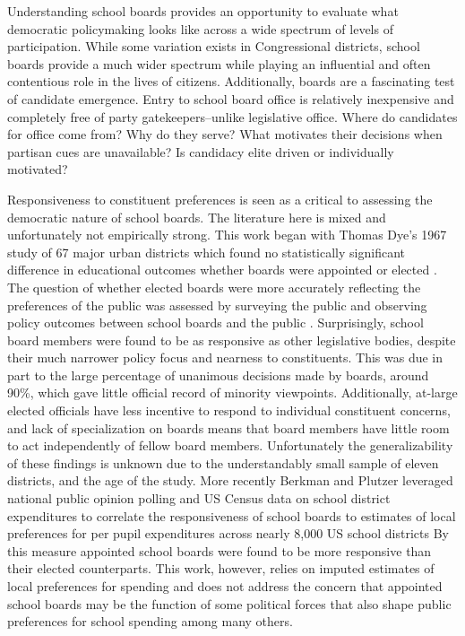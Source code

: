 Understanding school boards provides an opportunity to evaluate what democratic policymaking looks like across a wide spectrum of levels of participation. While some variation exists in Congressional districts, school boards provide a much wider spectrum while playing an influential and often contentious role in the lives of citizens. Additionally, boards are a fascinating test of candidate emergence. Entry to school board office is relatively inexpensive and completely free of party gatekeepers--unlike legislative office. Where do candidates for office come from? Why do they serve? What motivates their decisions when partisan cues are unavailable? Is candidacy elite driven or individually motivated? 
 
Responsiveness to constituent preferences is seen as a critical to assessing the democratic nature of school boards. The literature here is mixed and unfortunately not empirically strong. This work began with Thomas Dye's 1967 study of 67 major urban districts which found no statistically significant difference in educational outcomes whether boards were appointed or elected \citep{RefWorks:224}. The question of whether elected boards were more accurately reflecting the preferences of the public was assessed by surveying the public and observing policy outcomes between school boards and the public \citep{RefWorks:226,RefWorks:331}. Surprisingly, school board members were found to be as responsive as other legislative bodies, despite their much narrower policy focus and nearness to constituents. This was due in part to the large percentage of unanimous decisions made by boards, around 90\%, which gave little official record of minority viewpoints. Additionally, at-large elected officials have less incentive to respond to individual constituent concerns, and lack of specialization on boards means that board members have little room to act independently of fellow board members. Unfortunately the generalizability of these findings is unknown due to the understandably small sample of eleven districts, and the age of the study. More recently Berkman and Plutzer leveraged national public opinion polling and US Census data on school district expenditures to correlate the responsiveness of school boards to estimates of local preferences for per pupil expenditures across nearly 8,000 US school districts \citep{RefWorks:332}
By this measure appointed school boards were found to be more responsive than their elected counterparts. This work, however, relies on imputed estimates of local preferences for spending and does not address the concern that appointed school boards may be the function of some political forces that also shape public preferences for school spending among many others.

